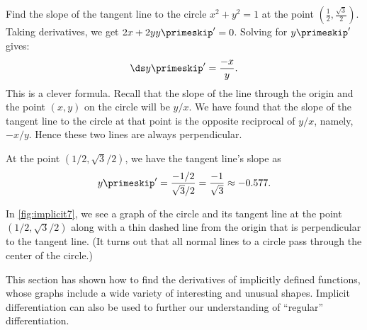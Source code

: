 \begin{example}\label{ex_implicit7}
Find the slope of the tangent line to the circle $x^2+y^2=1$ at the point $(\frac12, \frac{\sqrt3}2)$.
\solution
Taking derivatives, we get $2x+2yy\primeskip'=0$.  Solving for $y\primeskip'$  gives: \[\ds y\primeskip' = \frac{-x}{y}.\]
This is a clever formula. Recall that the slope of the line through the origin and the point $(x,y)$ on the circle will be $y/x$. We have found that the slope of the tangent line to the circle at that point is the opposite reciprocal of $y/x$, namely, $-x/y$. Hence these two lines are always perpendicular.

At the point $(1/2, \sqrt{3}/2)$, we have the tangent line's slope as
\[y\primeskip' = \frac{-1/2}{\sqrt{3}/2} = \frac{-1}{\sqrt{3}} \approx -0.577.\]

In \autoref{fig:implicit7}, we see a graph of the circle and its tangent line at the point $(1/2,\sqrt{3}/2)$ along with a thin dashed line from the origin that is perpendicular to the tangent line. (It turns out that all normal lines to a circle pass through the center of the circle.)

\end{example}

This section has shown how to find the derivatives of implicitly defined functions, whose graphs include a wide variety of interesting and unusual shapes. Implicit differentiation can also be used to further our understanding of ``regular'' differentiation. 

